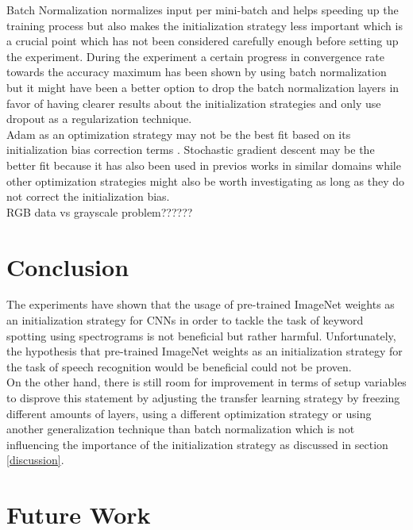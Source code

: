 \documentclass{article}
\theoremstyle{definition}
\theoremstyle{remark}
\begin{document}
Batch Normalization normalizes input per mini-batch and helps speeding up the training process but also makes the initialization strategy less important \cite{ioffe2015batch} which is a crucial point which has not been considered carefully enough before setting up the experiment. During the experiment a certain progress in convergence rate towards the accuracy maximum has been shown by using batch normalization but it might have been a better option to drop the batch normalization layers in favor of having clearer results about the initialization strategies and only use dropout as a regularization technique.\\
Adam as an optimization strategy may not be the best fit based on its initialization bias correction terms \cite{kingma2014adam}. Stochastic gradient descent may be the better fit because it has also been used in previos works in similar domains \cite{gouda2018speech} while other optimization strategies might also be worth investigating as long as they do not correct the initialization bias.\\

RGB data vs grayscale problem??????



\section{Conclusion}

The experiments have shown that the usage of pre-trained ImageNet weights as an initialization strategy for CNNs in order to tackle the task of keyword spotting using spectrograms is not beneficial but rather harmful. Unfortunately, the hypothesis that pre-trained ImageNet weights as an initialization strategy for the task of speech recognition would be beneficial could not be proven.\\

On the other hand, there is still room for improvement in terms of setup variables to disprove this statement by adjusting the transfer learning strategy by freezing different amounts of layers, using a different optimization strategy or using another generalization technique than batch normalization which is not influencing the importance of the initialization strategy as discussed in section \ref{discussion}.


\section{Future Work} \label{future_work}
\end{document}
